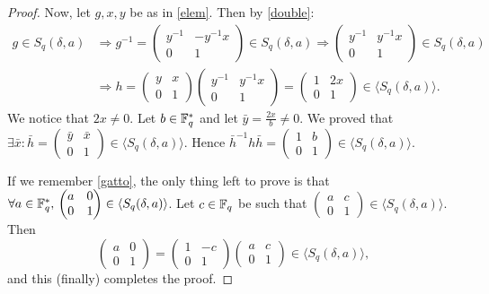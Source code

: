 \begin{theorem}
\begin{proof}
Now, let $g,x,y$ be as in \ref{elem}. Then by \ref{double}:
\begin{align*}
	g \in S_q(\delta,a) &\Rightarrow g^{-1}= \begin{pmatrix} y^{-1} & -y^{-1}x \\ 0 & 1 \end{pmatrix} \in S_q(\delta,a)
	\Rightarrow \begin{pmatrix} y^{-1} & y^{-1}x \\ 0 & 1 \end{pmatrix} \in S_q(\delta,a)\\ &\Rightarrow h=
	\begin{pmatrix} y & x \\ 0 & 1 \end{pmatrix}\begin{pmatrix} y^{-1} & y^{-1}x \\ 0 & 1 \end{pmatrix}=
	\begin{pmatrix} 1 & 2x \\ 0 & 1 \end{pmatrix} \in \langle S_q(\delta,a) \rangle.
\end{align*}
We notice that $2x\neq 0$. Let $b \in {\mathbb F}_q^{*}$ and let $\bar{y}=\frac{2x}{b}\neq 0$. We proved that
$\exists \bar{x} \colon  \bar{h}=\begin{pmatrix} \bar{y} & \bar{x} \\ 0 & 1 \end{pmatrix} \in \langle S_q(\delta,a) \rangle$.
Hence $\bar{h}^{-1} h \bar{h} = \begin{pmatrix} 1 & b \\ 0 & 1 \end{pmatrix}\in \langle S_q(\delta,a) \rangle$.

If we remember \ref{gatto}, the only thing left to prove is that $\forall a\in {\mathbb F}_q^{*}, \,\begin{pmatrix} a & 0 \\ 0 & 1 \end{pmatrix}\in \langle S_q(\delta,a) \rangle$. Let $c\in {\mathbb F}_q$ be such that $\begin{pmatrix} a & c \\ 0 & 1 \end{pmatrix}\in \langle S_q(\delta,a) \rangle$. Then
\begin{equation*}
	\begin{pmatrix} a & 0 \\ 0 & 1 \end{pmatrix} = \begin{pmatrix} 1 & -c \\ 0 & 1 \end{pmatrix} \begin{pmatrix} a & c \\ 0 & 1 \end{pmatrix} \in \langle S_q(\delta,a) \rangle,
\end{equation*}
and this (finally) completes the proof.
\end{proof}
\end{theorem}

